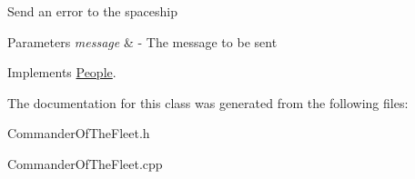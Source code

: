 Send an error to the spaceship 
\begin{DoxyParams}{Parameters}
{\em message} & -\/ The message to be sent \\
\hline
\end{DoxyParams}


Implements \hyperlink{classPeople_a572a35170f61d1848eb04b65baafb057}{People}.



The documentation for this class was generated from the following files\+:\begin{DoxyCompactItemize}
\item 
Commander\+Of\+The\+Fleet.\+h\item 
Commander\+Of\+The\+Fleet.\+cpp\end{DoxyCompactItemize}
